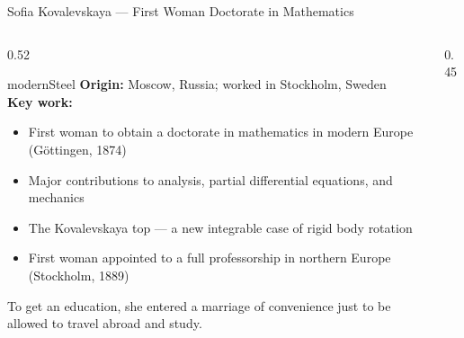 \begin{frame}[shrink=25]{Sofia Kovalevskaya --- First Woman Doctorate in Mathematics}

  \begin{columns}[T]
    \begin{column}{0.52\textwidth}
      \begin{personbox}{modernSteel}
        \textbf{Origin:} Moscow, Russia; worked in Stockholm, Sweden\\[3pt]
        \textbf{Key work:}
        \begin{itemize}\setlength\itemsep{2pt}
          \item First woman to obtain a doctorate in mathematics in modern
                Europe (G\"ottingen, 1874)
          \item Major contributions to analysis, partial differential
                equations, and mechanics
          \item The \alert{Kovalevskaya top} --- a new integrable case
                of rigid body rotation
          \item First woman appointed to a full professorship in northern
                Europe (Stockholm, 1889)
        \end{itemize}
      \end{personbox}

      \vspace{0.3em}
      \begin{insightbox}
        To get an education, she entered a marriage of convenience just
        to be allowed to travel abroad and study.
      \end{insightbox}
    \end{column}

    \begin{column}{0.45\textwidth}

      \vspace{0.4em}
    \end{column}
  \end{columns}

\end{frame}

